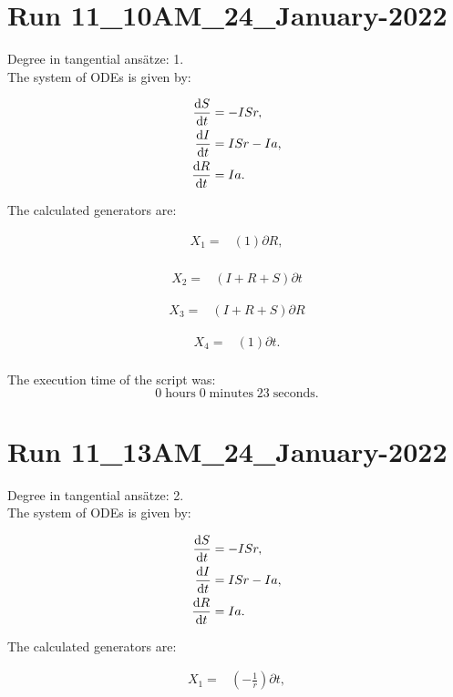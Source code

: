 \section*{Run 11\_10AM\_24\_January-2022}
Degree in tangential ansätze:	1.\\
The system of ODEs is given by:

\begin{align*}
\dv{S}{t}&=- I S r,\\
\dv{I}{t}&=I S r - I a,\\
\dv{R}{t}&=I a.\\
\end{align*}

\noindent The calculated generators are:

\begin{align*}
X_{1}=&\left(1 \right)\partial R,\\
\end{align*}

\begin{align*}
X_{2}=&\left(I+R+S \right)\partial t
\end{align*}

\begin{align*}
X_{3}=&\left(I+R+S \right)\partial R
\end{align*}

\begin{align*}
X_{4}=&\left(1 \right)\partial t.\\
\end{align*}

\noindent The execution time of the script was:
$$0\;\mathrm{hours}\;0\;\mathrm{minutes}\;23 \;\mathrm{seconds}.$$
\section*{Run 11\_13AM\_24\_January-2022}
Degree in tangential ansätze:	2.\\
The system of ODEs is given by:

\begin{align*}
\dv{S}{t}&=- I S r,\\
\dv{I}{t}&=I S r - I a,\\
\dv{R}{t}&=I a.\\
\end{align*}

\noindent The calculated generators are:

\begin{align*}
X_{1}=&\left(- \frac{1}{r} \right)\partial t,\\
\end{align*}

